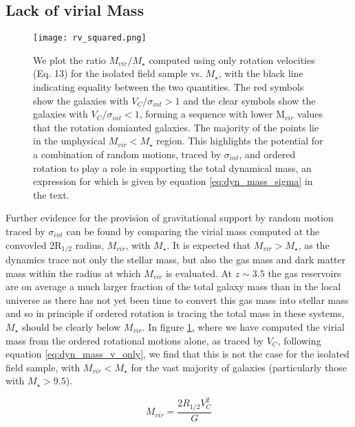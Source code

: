 \documentclass[fleqn,usenatbib]{mn2e}
\begin{document}
\subsection{Lack of virial Mass}\label{subsec:dynamical_masses}

\begin{figure}
\centering
\texttt{[image: rv\_squared.png]}
\caption{We plot the ratio $M_{vir}/M_{\star}$ computed using only rotation velocities (Eq. 13) for the isolated field sample vs. $M_{\star}$, with the black line indicating equality between the two quantities.
The red symbols show the galaxies with $V_{C}/\sigma_{int} > 1$ and the clear symbols show the galaxies with $V_{C}/\sigma_{int} < 1$, forming a sequence with lower M$_{vir}$ values that the rotation domianted galaxies.
The majority of the points lie in the unphysical $M_{vir} < M_{\star}$ region.
This highlights the potential for a combination of random motions, traced by $\sigma_{int}$, and ordered rotation to play a role in supporting the total dynamical mass, an expression for which is given by equation \protect\ref{eq:dyn_mass_sigma} in the text.}
\label{fig:dyn_masses}
\end{figure}

Further evidence for the provision of gravitational support by random motion traced by $\sigma_{int}$ can be found by comparing the virial mass computed at the convovled 2R$_{1/2}$ radius, $M_{vir}$, with $M_{\star}$.
It is expected that $M_{vir} > M_{\star}$, as the dynamics trace not only the stellar mass, but also the gas mass and dark matter mass within the radius at which $M_{vir}$ is evaluated.
At $z \sim 3.5$ the gas reservoirs are on average a much larger fraction of the total galaxy mass than in the local universe \citep[e.g.][]{Tacconi2013,Saintonge2013,Wisnioski2015} as there has not yet been time to convert this gas mass into stellar mass and so in principle if ordered rotation is tracing the total mass in these systems, $M_{\star}$ should be clearly below $M_{vir}$.
In figure \ref{fig:dyn_masses}, where we have computed the virial mass from the ordered rotational motions alone, as traced by $V_{C}$, following equation \ref{eq:dyn_mass_v_only}, we find that this is not the case for the isolated field sample, with $M_{vir} < M_{\star}$ for the vast majority of galaxies (particularly those with $M_{\star} > 9.5$).

\begin{equation}\label{eq:dyn_mass_v_only}
   M_{vir} = \frac{2R_{1/2}V_{C}^{2}}{G}
\end{equation}
\end{document}
